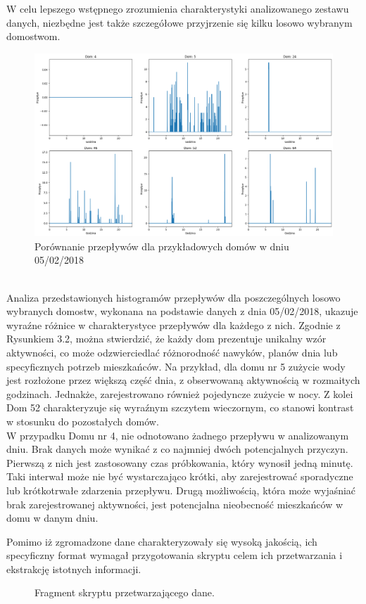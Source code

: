 \documentclass[a4paper,twoside,12pt]{book}
\begin{document}
\newpage
W celu lepszego wstępnego zrozumienia charakterystyki analizowanego zestawu danych, niezbędne jest także szczegółowe przyjrzenie się kilku losowo wybranym domostwom.\\
\begin{figure}[!h]
	\centering
	\includegraphics[width=1\textwidth]{img/Dane_nowe_compare.png}
	\caption{Porównanie przepływów dla przykładowych domów w dniu 05/02/2018}
	\label{fig:etykieta-rysunku}
\end{figure}\\
Analiza przedstawionych histogramów przepływów dla poszczególnych losowo wybranych domostw, wykonana na podstawie danych z dnia 05/02/2018, ukazuje wyraźne różnice w charakterystyce przepływów dla każdego z nich. Zgodnie z Rysunkiem 3.2, można stwierdzić, że każdy dom prezentuje unikalny wzór aktywności, co może odzwierciedlać różnorodność nawyków, planów dnia lub specyficznych potrzeb mieszkańców. Na przykład, dla domu nr 5 zużycie wody jest rozłożone przez większą część dnia, z obserwowaną aktywnością w rozmaitych godzinach. Jednakże, zarejestrowano również pojedyncze zużycie w nocy. Z kolei Dom 52 charakteryzuje się wyraźnym szczytem wieczornym, co stanowi kontrast w stosunku do pozostałych domów.\\W przypadku Domu nr 4, nie odnotowano żadnego przepływu w analizowanym dniu. Brak danych może wynikać z co najmniej dwóch potencjalnych przyczyn. Pierwszą z nich jest zastosowany czas próbkowania, który wynosił jedną minutę. Taki interwał może nie być wystarczająco krótki, aby zarejestrować sporadyczne lub krótkotrwałe zdarzenia przepływu. Drugą możliwością, która może wyjaśniać brak zarejestrowanej aktywności, jest potencjalna nieobecność mieszkańców w domu w danym dniu.

\newpage
Pomimo iż zgromadzone dane charakteryzowały się wysoką jakością, ich specyficzny format wymagał przygotowania skryptu celem ich przetwarzania i ekstrakcję istotnych informacji.\\
\begin{figure}[!h]
	\centering
	
	\caption{Fragment skryptu przetwarzającego dane.}
	\label{fig:pseudokod:listings}
\end{figure}
\end{document}
